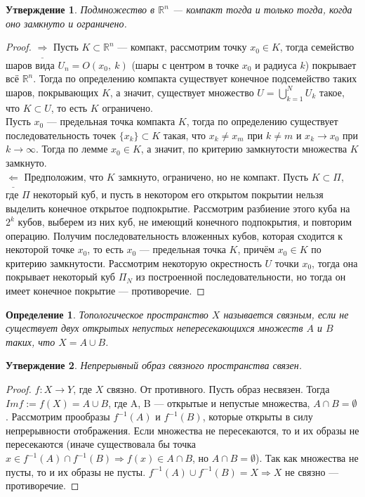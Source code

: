 \documentclass[12pt]{article}
\theoremstyle{plain}
\newtheorem{subtheorem}{Утверждение}[section]
\newtheorem{definition}{Определение}[section]
\newcommand{\R}{\mathbb R}
\begin{document}
    \begin{subtheorem}
        Подмножество в $\R^n$ --- компакт тогда и только тогда, когда оно замкнуто и ограничено.
    \end{subtheorem}
    \begin{proof}
        $\underline{\Longrightarrow}$ Пусть $K\subset\R^n$ --- компакт, рассмотрим точку $x_0\in K$, тогда семейство шаров вида $U_n=O(x_0, \ k)$ (шары с центром в точке $x_0$ и радиуса $k$) покрывает всё $\R^n$. Тогда по определению компакта существует конечное подсемейство таких шаров, покрывающих $K$, а значит, существует множество $U=\bigcup\limits_{k=1}^NU_k$ такое, что $K\subset U$, то есть $K$ ограничено.\\
        Пусть $x_0$ --- предельная точка компакта $K$, тогда по определению существует последовательность точек $\{x_k\}\subset K$ такая, что $x_k\neq x_m$ при $k\neq m$ и $x_k\to x_0$ при $k\to\infty$. Тогда по лемме $x_0\in K$, а значит, по критерию замкнутости множества $K$ замкнуто.\\
        $\underline{\Longleftarrow}$ Предположим, что $K$ замкнуто, ограничено, но не компакт. Пусть $K\subset\Pi$, где $\Pi$ некоторый куб, и пусть в некотором его открытом покрытии нельзя выделить конечное открытое подпокрытие. Рассмотрим разбиение этого куба на $2^k$ кубов, выберем из них куб, не имеющий конечного подпокрытия, и повторим операцию. Получим последовательность вложенных кубов, которая сходится к некоторой точке $x_0$, то есть $x_0$ --- предельная точка $K$, причём $x_0\in K$ по критерию замкнутости. Рассмотрим некоторую окрестность $U$ точки $x_0$, тогда она покрывает некоторый куб $\Pi_N$ из построенной последовательности, но тогда он имеет конечное покрытие --- противоречие.
    \end{proof}
    \begin{definition}
        Топологическое пространство $X$ называется \textit{связным}, если не существует двух открытых непустых непересекающихся множеств $A$ и $B$ таких, что $X = A \cup B$.
    \end{definition}
    \begin{subtheorem}
        Непрерывный образ связного пространства связен.
    \end{subtheorem}
    \begin{proof}
        $f: X \to Y$, где $X$ связно. От противного. Пусть образ несвязен. Тогда $Imf := f(X) = A \cup B$, где A, B — открытые и непустые множества, $A \cap B = \emptyset$. Рассмотрим прообразы $f^{-1}(A)$ и $f^{-1}(B)$, которые открыты в силу непрерывности отображения. Если множества не пересекаются, то и их образы не пересекаются (иначе существовала бы точка $x \in f^{-1}(A) \cap f^{-1}(B) \Longrightarrow f(x) \in A \cap B$, но $A \cap B = \emptyset$). Так как множества не пусты, то и их образы не пусты. $f^{-1}(A) \cup f^{-1}(B) = X \Longrightarrow X$ не связно — противоречие. 
    \end{proof}
\end{document}
